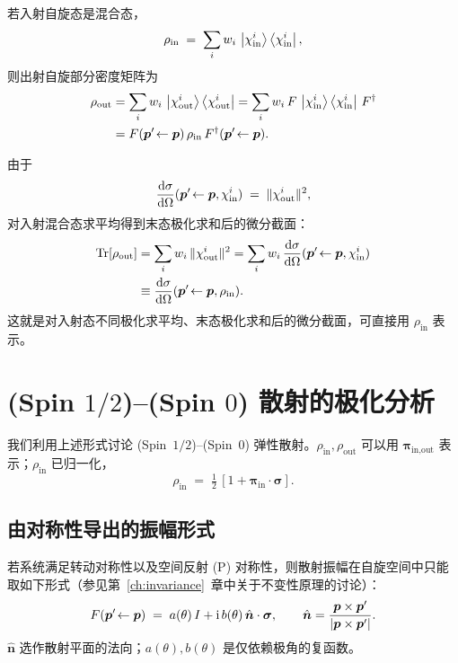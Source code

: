 若入射自旋态是混合态，
\[
  \rho_{\text{in}} \;=\; \sum_i w_i\,\ket{\chi_{\text{in}}^i}\bra{\chi_{\text{in}}^i},
\]
则出射自旋部分密度矩阵为
\begin{align}
  \rho_{\text{out}}
  &=\sum_i w_i\,\ket{\chi_{\text{out}}^i}\bra{\chi_{\text{out}}^i}
   = \sum_i w_i\, F\,\ket{\chi_{\text{in}}^i}\bra{\chi_{\text{in}}^i}\,F^\dagger \notag\\
  &= F(\bm{p}'\!\leftarrow\bm{p})\,\rho_{\text{in}}\,F^\dagger(\bm{p}'\!\leftarrow\bm{p}).
  \label{eq:rhoout}
\end{align}

由于
\[
  \frac{\mathrm{d}\sigma}{\mathrm{d}\Omega}(\bm{p}'\!\leftarrow\bm{p},\chi^i_{\text{in}})
  \;=\; \|\chi_{\text{out}}^i\|^2,
\]
对入射混合态求平均得到末态极化求和后的微分截面：
\begin{align}
  \operatorname{Tr}[\rho_{\text{out}}]
  &= \sum_i w_i\,\|\chi_{\text{out}}^i\|^2
   = \sum_i w_i\,\frac{\mathrm{d}\sigma}{\mathrm{d}\Omega}(\bm{p}'\!\leftarrow\bm{p},\chi^i_{\text{in}}) \notag\\
  &\equiv \frac{\mathrm{d}\sigma}{\mathrm{d}\Omega}(\bm{p}'\!\leftarrow\bm{p},\rho_{\text{in}}).
  \label{eq:dsigma-rho-spinhalf}
\end{align}
这就是对入射态不同极化求平均、末态极化求和后的微分截面，可直接用 $\rho_{\text{in}}$ 表示。

\section{(Spin $1/2$)–(Spin $0$) 散射的极化分析}
\label{sec:half-zero-scattering}

我们利用上述形式讨论 (Spin~$1/2$)–(Spin~$0$) 弹性散射。$\rho_{\text{in}},\rho_{\text{out}}$ 可以用 $\bm{\pi}_{\text{in,out}}$ 表示；$\rho_{\text{in}}$ 已归一化，
\begin{equation}
  \rho_{\text{in}} \;=\; \tfrac{1}{2}\,[1+\bm{\pi}_{\text{in}}\cdot\bm{\sigma}].
  \label{eq:rhoin-piin}
\end{equation}

\subsection{由对称性导出的振幅形式}

若系统满足转动对称性以及空间反射 (P) 对称性，则散射振幅在自旋空间中只能取如下形式（参见第~\ref{ch:invariance}~章中关于不变性原理的讨论）：
\begin{equation}
  F(\bm{p}'\!\leftarrow\bm{p}) \;=\; a(\theta)\,I + \mathrm{i}\, b(\theta)\,\hat{\bm{n}}\cdot\bm{\sigma}, \qquad \hat{\bm{n}} = \frac{\bm{p}\times\bm{p}'}{|\bm{p}\times\bm{p}'|}.
  \label{eq:F-rotpar}
\end{equation}
$\hat{\bm n}$ 选作散射平面的法向；$a(\theta), b(\theta)$ 是仅依赖极角的复函数。

